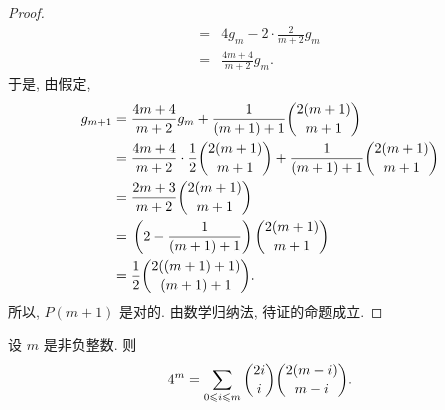 \documentclass[../libro.tex]{subfiles}
\begin{document}
\begin{proof}
\begin{align*}
        = {} &
        4 g_m - 2 \cdot \frac{2}{m+2} g_m
        \\
        = {} &
        \frac{4m + 4}{m + 2} g_m.
    \end{align*}
    于是, 由假定,
    \begin{align*}
        g_{m+1}
        = {} &
        \frac{4m + 4}{m + 2} g_m + \frac{1}{(m+1) + 1} \dbinom{2(m+1)}{m+1}
        \\
        = {} &
        \frac{4m + 4}{m + 2} \cdot \frac{1}{2} \dbinom{2(m+1)}{m+1}
        + \frac{1}{(m+1) + 1} \dbinom{2(m+1)}{m+1}
        \\
        = {} &
        \frac{2m+3}{m+2} \dbinom{2(m+1)}{m+1}
        \\
        = {} &
        \left(2 - \frac{1}{(m+1)+1}\right) \dbinom{2(m+1)}{m+1}
        \\
        = {} &
        \frac{1}{2} \dbinom{2((m+1)+1)}{(m+1)+1}.
    \end{align*}
    所以, \(P(m+1)\) 是对的.
    由数学归纳法, 待证的命题成立.
\end{proof}

\begin{theorem}
    设 \(m\) 是非负整数.
    则
    \begin{align*}
        4^m = \sum_{0 \leq i \leq m} {\dbinom{2i}{i} \dbinom{2(m-i)}{m-i}}.
    \end{align*}
\end{theorem}
\end{document}
